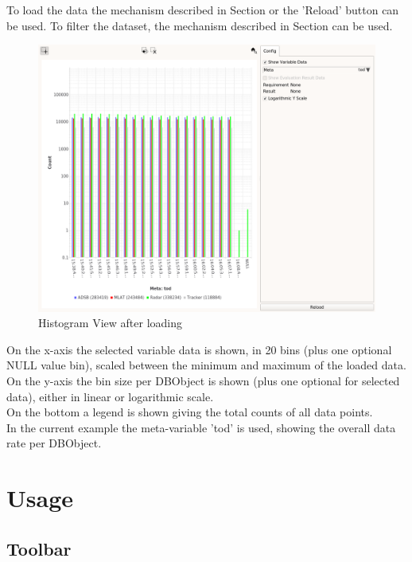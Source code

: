 To load the data the mechanism described in Section  or the 'Reload' button can be used. To filter the dataset, the mechanism described in Section  can be used. \\

\begin{figure}[H]
    \hspace*{-2cm}
    \includegraphics[width=18cm,frame]{../screenshots/histogram_loaded.png}
  \caption{Histogram View after loading}
\end{figure}

On the x-axis the selected variable data is shown, in 20 bins (plus one optional NULL value bin), scaled between the minimum and maximum of the loaded data. On the y-axis the bin size per DBObject is shown (plus one optional for selected data), either in linear or logarithmic scale. \\


On the bottom a legend is shown giving the total counts of all data points. \\

In the current example the meta-variable 'tod' is used, showing the overall data rate per DBObject.


\section{Usage}

\subsection{Toolbar}

